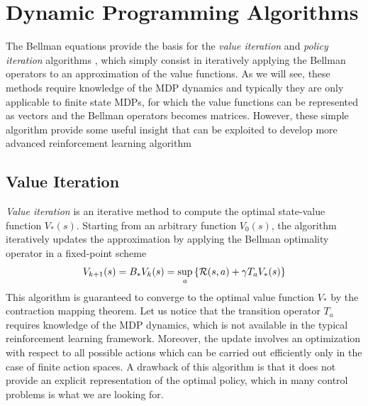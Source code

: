 \section{Dynamic Programming Algorithms}
\label{sec:policy_evaluation}
The Bellman equations provide the basis for the \emph{value iteration} and \emph{policy iteration} algorithms \cite{szepesvari2010algorithms}, which simply consist in iteratively applying the Bellman operators to an approximation of the value functions. 
As we will see, these methods require knowledge of the MDP dynamics and typically they are only applicable to finite state MDPs, for which the value functions can be represented as vectors and the Bellman operators becomes matrices. However, these simple algorithm provide some useful insight that can be exploited to develop more advanced reinforcement learning algorithm 

\subsection{Value Iteration}
\emph{Value iteration} is an iterative method to compute the optimal state-value function $V_*(s)$. Starting from an arbitrary function $V_0(s)$, the algorithm iteratively updates the approximation by applying the Bellman optimality operator in a fixed-point scheme
\begin{equation*}
	V_{k+1}(s) = B_* V_k(s) = \sup_a \left\{\mathcal{R}(s,a) + \gamma T_a V_*(s)\right\}
\end{equation*}
This algorithm is guaranteed to converge to the optimal value function $V_*$ by the contraction mapping theorem. Let us notice that the transition operator $T_a$ requires knowledge of the MDP dynamics, which is not available in the typical reinforcement learning framework. Moreover, the update involves an optimization with respect to all possible actions which can be carried out efficiently only in the case of finite action spaces. A drawback of this algorithm is that it does not provide an explicit representation of the optimal policy, which in many control problems is what we are looking for.  

